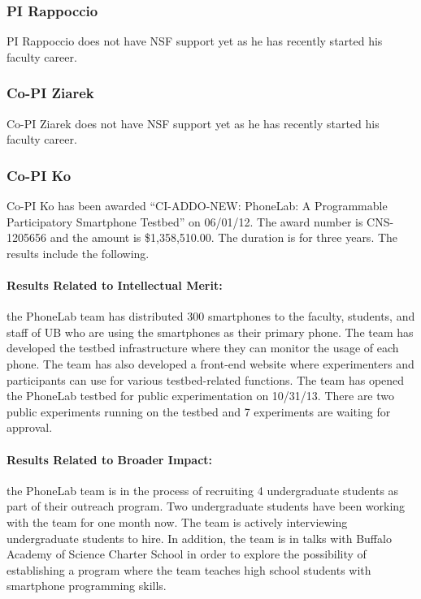 \documentclass[times,11pt]{article}
\begin{document}
\subsubsection{PI Rappoccio}
PI Rappoccio does not have NSF support yet as he has recently started his
faculty career.

\subsubsection{Co-PI Ziarek}
Co-PI Ziarek does not have NSF support yet as he has recently started his
faculty career.

\subsubsection{Co-PI Ko}
Co-PI Ko has been awarded ``CI-ADDO-NEW: PhoneLab: A Programmable Participatory
Smartphone Testbed'' on 06/01/12. The award number is CNS-1205656 and the amount
is \$1,358,510.00. The duration is for three years. The results include the
following.

\paragraph{Results Related to Intellectual Merit:} the PhoneLab team has
distributed 300 smartphones to the faculty, students, and staff of UB who are
using the smartphones as their primary phone. The team has developed the testbed
infrastructure where they can monitor the usage of each phone. The team has also
developed a front-end website where experimenters and participants can use for
various testbed-related functions. The team has opened the PhoneLab testbed for
public experimentation on 10/31/13. There are two public experiments running on
the testbed and 7 experiments are waiting for approval.

\paragraph{Results Related to Broader Impact:} the PhoneLab team is in the
process of recruiting 4 undergraduate students as part of their outreach
program. Two undergraduate students have been working with the team for one
month now. The team is actively interviewing undergraduate students to hire. In
addition, the team is in talks with Buffalo Academy of Science Charter School in
order to explore the possibility of establishing a program where the team
teaches high school students with smartphone programming skills.
\end{document}
